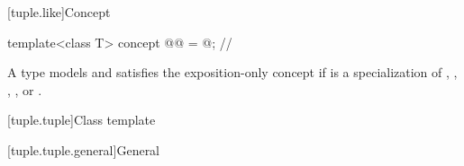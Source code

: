 [tuple.like]{Concept }

\begin{itemdecl}
template<class T>
  concept @@ = @\seebelownc@;           // \expos
\end{itemdecl}

\begin{itemdescr}
\pnum
A type  models and satisfies
the exposition-only concept 
if  is a specialization of
, , , , or .
\end{itemdescr}

[tuple.tuple]{Class template }

[tuple.tuple.general]{General}

